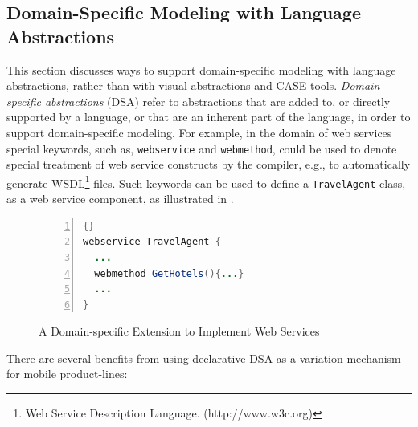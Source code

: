 \subsection{Domain-Specific Modeling with Language Abstractions}
\label{sec:var.dsa}

This section discusses ways to support domain-specific modeling with language abstractions, rather than with visual abstractions and CASE tools. \textit{Domain-specific abstractions} (DSA) refer to abstractions that are added to, or directly supported by a language, or that are an inherent part of the language, in order to support domain-specific modeling. For example, in the domain of web services special keywords, such as, \texttt{webservice} and \texttt{webmethod}, could be used to denote special treatment of web service constructs by the compiler, e.g., to automatically generate WSDL\footnote{Web Service Description Language. (http://www.w3c.org)} files. Such keywords can be used to define a \texttt{TravelAgent} class, as a web service component, as illustrated in .

\begin{figure}[ht]
\begin{center}
\begin{minipage}{7cm}
\begin{scriptsize}
\begin{lstlisting}[numbers=left,language=Java,frame=leftline]{}
webservice TravelAgent {
  ...
  webmethod GetHotels(){...}
  ...
}
\end{lstlisting}
\end{scriptsize}
\end{minipage}
\end{center}
\caption{A Domain-specific Extension to Implement Web Services}
\label{fig:webservice-dsl}
\end{figure}
 
\noindent There are several benefits from using declarative DSA as a variation mechanism for mobile product-lines:

